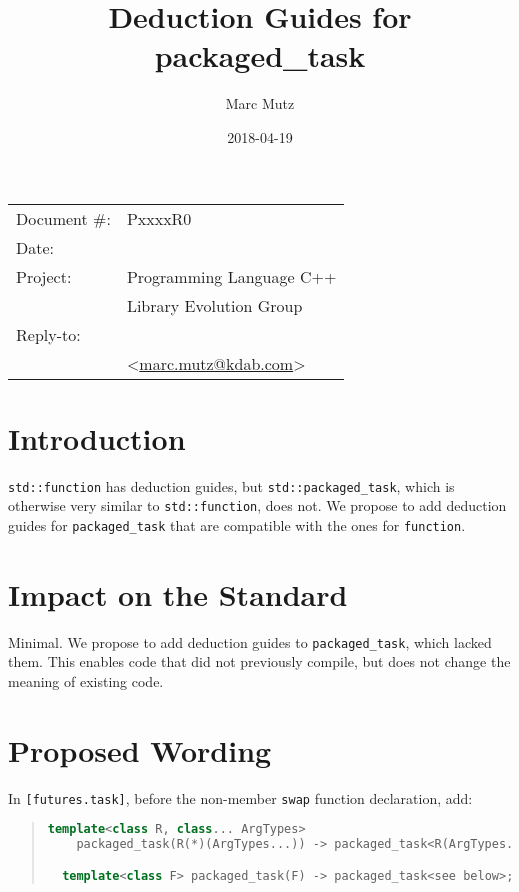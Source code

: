\documentclass[11pt]{article}
\date{}
\title{Deduction Guides for packaged\_task}
\makeatletter
\newcommand{\emailaddress}{marc.mutz@kdab.com}
\newcommand{\email}{\href{mailto:\emailaddress}{\emailaddress}}
\makeatother
\begin{document}
\maketitle\vspace{-2cm}

\begin{flushright}
  \begin{tabular}{ll}
  Document \#:&PxxxxR0\\
  Date:       &\date{2018-04-19}\\
  Project:    &Programming Language C++\\
              &Library Evolution Group\\
  Reply-to:   &\author{Marc Mutz}\\
              &\textless\email\textgreater
  \end{tabular}
\end{flushright}

\section{Introduction}

\texttt{std::function} has deduction guides, but
\texttt{std::packaged\_task}, which is otherwise very similar to
\texttt{std::function}, does not. We propose to add deduction guides
for \texttt{packaged\_task} that are compatible with the ones for
\texttt{function}.

\section{Impact on the Standard}

Minimal. We propose to add deduction guides to
\texttt{packaged\_task}, which lacked them. This enables code that did
not previously compile, but does not change the meaning of existing code.

\section{Proposed Wording}

In \texttt{[futures.task]}, before the non-member
\texttt{swap} function declaration, add:

\begin{quote}
\begin{lstlisting}[language=C++]
  template<class R, class... ArgTypes>
    packaged_task(R(*)(ArgTypes...)) -> packaged_task<R(ArgTypes...)>;

  template<class F> packaged_task(F) -> packaged_task<see below>;
\end{lstlisting}
\end{quote}
\end{document}
